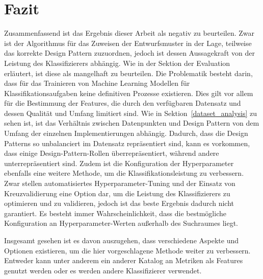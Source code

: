 \section{Fazit}

Zusammenfassend ist das Ergebnis dieser Arbeit als negativ zu beurteilen. Zwar ist der Algorithmus für das Zuweisen der Entwurfsmuster in der Lage, teilweise das korrekte Design Pattern zuzuordnen, jedoch ist dessen Aussagekraft von der Leistung des Klassifizierers abhängig. Wie in der Sektion der Evaluation erläutert, ist diese als mangelhaft zu beurteilen.
Die Problematik besteht darin, dass für das Trainieren von Machine Learning Modellen für Klassifikationsaufgaben keine definitiven Prozesse existieren.
Dies gilt vor allem für die Bestimmung der Features, die durch den verfügbaren Datensatz und dessen Qualität und Umfang limitiert sind. 
Wie in Sektion~\ref{dataset_analysis} zu sehen ist, ist das Verhältnis zwischen Datenpunkten und Design Pattern von dem Umfang der einzelnen Implementierungen abhängig. Dadurch, dass die Design Patterns so unbalanciert im Datensatz repräsentiert sind, kann es vorkommen, dass einige Design-Pattern-Rollen überrepräsentiert, während andere unterrepräsentiert sind. Zudem ist die Konfiguration der Hyperparameter ebenfalls eine weitere Methode, um die Klassifikationsleistung zu verbessern. Zwar stellen automatisiertes Hyperparameter-Tuning und der Einsatz von Kreuzvalidierung eine Option dar, um die Leistung des Klassifizierers zu optimieren und zu validieren, jedoch ist das beste Ergebnis dadurch nicht garantiert. Es besteht immer Wahrscheinlichkeit, dass die bestmögliche Konfiguration an Hyperparameter-Werten außerhalb des Suchraumes liegt.

Insgesamt gesehen ist es davon auszugehen, dass verschiedene Aspekte und Optionen existieren, um die hier vorgeschlagene Methode weiter zu verbessern. 
Entweder kann unter anderem ein anderer Katalog an Metriken als Features genutzt werden oder es werden andere Klassifizierer verwendet.
